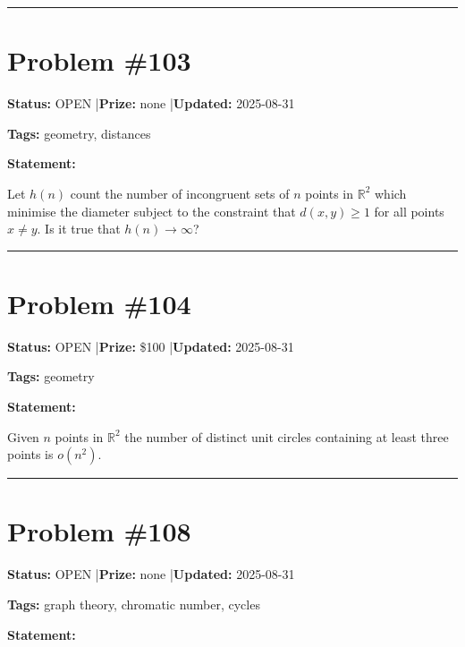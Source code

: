 \documentclass{article}
\begin{document}
\noindent\rule{\linewidth}{0.4pt}


\section{Problem \#103}
\label{prob:103}

\noindent\textbf{Status:} OPEN \quad|\quad \textbf{Prize:} none \quad|\quad \textbf{Updated:} 2025-08-31

\noindent\textbf{Tags:} geometry, distances

\medskip

\noindent\textbf{Statement:}

Let $h(n)$ count the number of incongruent sets of $n$ points in $\mathbb{R}^2$ which minimise the diameter subject to the constraint that $d(x,y)\geq 1$ for all points $x\neq y$. Is it true that $h(n)\to \infty$?

\noindent\rule{\linewidth}{0.4pt}


\section{Problem \#104}
\label{prob:104}

\noindent\textbf{Status:} OPEN \quad|\quad \textbf{Prize:} \$100 \quad|\quad \textbf{Updated:} 2025-08-31

\noindent\textbf{Tags:} geometry

\medskip

\noindent\textbf{Statement:}

Given $n$ points in $\mathbb{R}^2$ the number of distinct unit circles containing at least three points is $o(n^2)$.

\noindent\rule{\linewidth}{0.4pt}


\section{Problem \#108}
\label{prob:108}

\noindent\textbf{Status:} OPEN \quad|\quad \textbf{Prize:} none \quad|\quad \textbf{Updated:} 2025-08-31

\noindent\textbf{Tags:} graph theory, chromatic number, cycles

\medskip

\noindent\textbf{Statement:}
\end{document}
